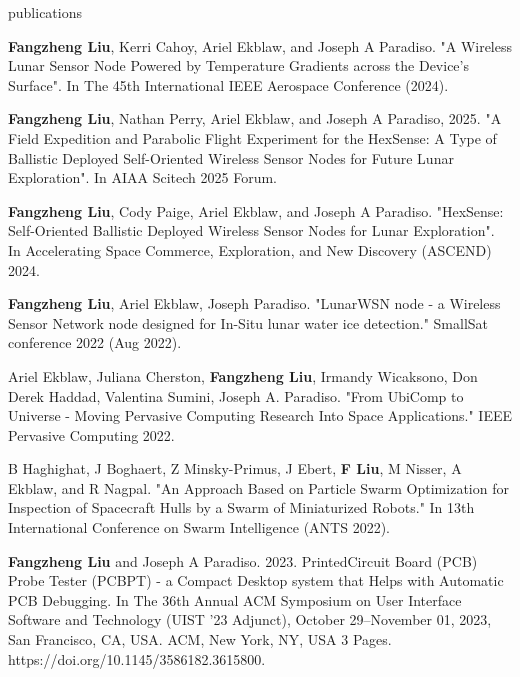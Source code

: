 \documentclass{resume} %
\begin{document}
\begin{rSection}{publications}
\begin{itemlabel}
\item \textbf{Fangzheng Liu}, Kerri Cahoy, Ariel Ekblaw, and Joseph A Paradiso.
"A Wireless Lunar Sensor Node Powered by Temperature Gradients across the Device's Surface".
In The 45th International IEEE Aerospace Conference (2024).
\smallskip
\smallskip
\smallskip

\item \textbf{Fangzheng Liu}, Nathan Perry, Ariel Ekblaw, and Joseph A Paradiso, 2025.
"A Field Expedition and Parabolic Flight Experiment for the HexSense: A Type of Ballistic
Deployed Self-Oriented Wireless Sensor Nodes for Future Lunar Exploration".
In AIAA Scitech 2025 Forum.
\smallskip
\smallskip
\smallskip

\item \textbf{Fangzheng Liu},
Cody Paige, Ariel Ekblaw, and Joseph A Paradiso.
"HexSense: Self-Oriented Ballistic Deployed Wireless Sensor Nodes for Lunar Exploration".
In Accelerating Space Commerce, Exploration, and New Discovery (ASCEND) 2024.
\smallskip
\smallskip
\smallskip

\item \textbf{Fangzheng Liu}, Ariel Ekblaw, Joseph Paradiso.
"LunarWSN node - a Wireless Sensor Network node designed for In-Situ lunar water ice detection."
SmallSat conference 2022 (Aug 2022).
\smallskip
\smallskip
\smallskip

\item Ariel Ekblaw, Juliana Cherston, \textbf{Fangzheng Liu}, Irmandy Wicaksono, Don Derek Haddad, Valentina Sumini, Joseph A. Paradiso.
"From UbiComp to Universe - Moving Pervasive Computing Research Into Space Applications."
IEEE Pervasive Computing 2022.
\smallskip
\smallskip
\smallskip

\item B Haghighat, J Boghaert, Z Minsky-Primus, J Ebert, \textbf{F Liu}, M Nisser, A Ekblaw, and R Nagpal.
"An Approach Based on Particle Swarm Optimization for Inspection of Spacecraft Hulls by a Swarm of Miniaturized Robots."
In 13th International Conference on Swarm Intelligence (ANTS 2022).
\smallskip
\smallskip
\smallskip

\item \textbf{Fangzheng Liu} and Joseph A Paradiso. 2023.
PrintedCircuit Board (PCB) Probe Tester (PCBPT) - a Compact Desktop system that Helps with Automatic PCB Debugging.
In The 36th Annual ACM Symposium on User Interface Software and Technology (UIST '23 Adjunct),
October 29--November 01, 2023, San Francisco, CA, USA. ACM, New York, NY, USA 3 Pages. https://doi.org/10.1145/3586182.3615800.
\smallskip
\smallskip
\smallskip


\end{itemlabel}
\end{rSection}
\end{document}
